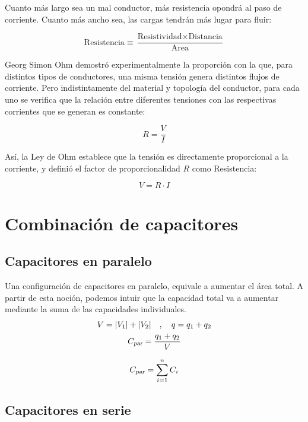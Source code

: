 \documentclass[a5paper,12pt,twoside]{book}
\begin{document}
Cuanto más largo sea un mal conductor, más resistencia opondrá al paso de corriente. Cuanto más ancho sea, las cargas tendrán más lugar para fluir:

\begin{equation*}
    \text{Resistencia} \equiv \frac{\text{Resistividad} \times \text{Distancia}}{\text{Area}}
\end{equation*}

Georg Simon Ohm demostró experimentalmente la proporción con la que, para distintos tipos de conductores, una misma tensión genera distintos flujos de corriente. Pero indistintamente del material y topología del conductor, para cada uno se verifica que la relación entre diferentes tensiones con las respectivas corrientes que se generan es constante:

\begin{equation*}
    R = \frac{V}{I}
\end{equation*}

Así, la Ley de Ohm establece que la tensión es directamente proporcional a la corriente, y definió el factor de proporcionalidad $R$ como Resistencia:

\begin{equation}
    V = R \cdot I
\end{equation}


\section{Combinación de capacitores}


\subsection*{Capacitores en paralelo}

Una configuración de capacitores en paralelo, equivale a aumentar el área total. A partir de esta noción, podemos intuir que la capacidad total va a aumentar mediante la suma de las capacidades individuales.
\begin{gather*}
    V = {\left| {V_1} \right|} + {\left| {V_2} \right|} \quad , \quad q = q_1 + q_2
    \\
    {{C}_\textsl{{par}}} = \frac{q_1 + q_2}{V}
\end{gather*}

\begin{equation*}
    {{C}_\textsl{{par}}} = \sum_{i=1}^n C_i
\end{equation*}


\subsection*{Capacitores en serie}
\end{document}
